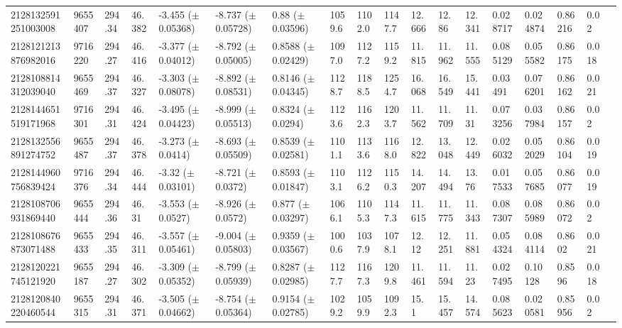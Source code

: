 \begin{sidewaystable}[htbp]
{\begin{tabular}{llllllllllllllllll}
        2128132591251003008 & 9655407 & 294.34 & 46.382 & -3.455 ($\pm$ 0.05368) & -8.737 ($\pm$ 0.05728) & 0.88 ($\pm$ 0.03596) & 1059.6 & 1102.0 & 1147.7 & 12.666 & 12.86 & 12.341 & 0.028717 & 0.024874 & 0.86216 & 0.02 & \\
        2128121213876982016 & 9716220 & 294.27 & 46.416 & -3.377 ($\pm$ 0.04012) & -8.792 ($\pm$ 0.05005) & 0.8588 ($\pm$ 0.02429) & 1097.0 & 1127.2 & 1159.2 & 11.815 & 11.962 & 11.555 & 0.085129 & 0.055582 & 0.86175 & 0.018 & \\
        2128108814312039040 & 9655469 & 294.37 & 46.327 & -3.303 ($\pm$ 0.08078) & -8.892 ($\pm$ 0.08531) & 0.8146 ($\pm$ 0.04345) & 1128.7 & 1188.5 & 1254.7 & 16.068 & 16.549 & 15.441 & 0.03491 & 0.076201 & 0.86162 & 0.021 & \\
        2128144651519171968 & 9716301 & 294.31 & 46.424 & -3.495 ($\pm$ 0.04423) & -8.999 ($\pm$ 0.05513) & 0.8324 ($\pm$ 0.0294) & 1123.6 & 1162.3 & 1203.7 & 11.562 & 11.709 & 11.31 & 0.073256 & 0.037984 & 0.86157 & 0.02 & \\
        2128132556891274752 & 9655487 & 294.37 & 46.378 & -3.273 ($\pm$ 0.0414) & -8.693 ($\pm$ 0.05509) & 0.8539 ($\pm$ 0.02581) & 1101.1 & 1133.6 & 1168.0 & 12.822 & 13.048 & 12.449 & 0.026032 & 0.052029 & 0.86104 & 0.019 & \\
        2128144960756839424 & 9716376 & 294.34 & 46.444 & -3.32 ($\pm$ 0.03101) & -8.721 ($\pm$ 0.0372) & 0.8593 ($\pm$ 0.01847) & 1103.1 & 1126.2 & 1150.3 & 14.207 & 14.494 & 13.76 & 0.017533 & 0.057685 & 0.86077 & 0.019 & \\
        2128108706931869440 & 9655444 & 294.36 & 46.31 & -3.553 ($\pm$ 0.0527) & -8.926 ($\pm$ 0.0572) & 0.877 ($\pm$ 0.03297) & 1066.1 & 1105.3 & 1147.3 & 11.615 & 11.775 & 11.343 & 0.087307 & 0.085989 & 0.86072 & 0.02 & \\
        2128108676873071488 & 9655433 & 294.35 & 46.311 & -3.557 ($\pm$ 0.05461) & -9.004 ($\pm$ 0.05803) & 0.9359 ($\pm$ 0.03567) & 1000.6 & 1037.9 & 1078.1 & 12.12 & 12.251 & 11.881 & 0.054324 & 0.084114 & 0.8602 & 0.021 & \\
        2128120221745121920 & 9655187 & 294.27 & 46.302 & -3.309 ($\pm$ 0.05352) & -8.799 ($\pm$ 0.05939) & 0.8287 ($\pm$ 0.02985) & 1127.7 & 1167.3 & 1209.8 & 11.461 & 11.594 & 11.23 & 0.027495 & 0.10128 & 0.8596 & 0.018 & \\
        2128120840220460544 & 9655315 & 294.31 & 46.371 & -3.505 ($\pm$ 0.04662) & -8.754 ($\pm$ 0.05364) & 0.9154 ($\pm$ 0.02785) & 1029.2 & 1059.9 & 1092.3 & 15.1 & 15.457 & 14.574 & 0.085623 & 0.020581 & 0.85956 & 0.02 & \\

\end{tabular}}
\end{sidewaystable}
